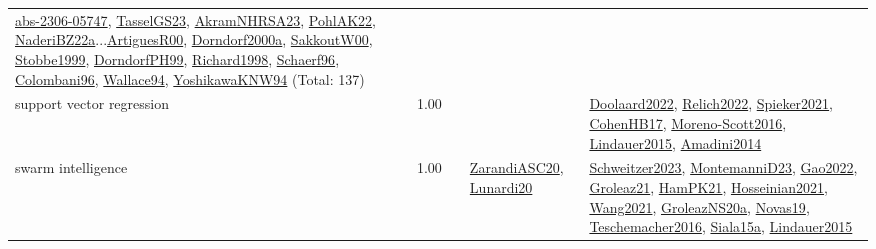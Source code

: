{\begin{longtable}{p{3cm}r>{\raggedright\arraybackslash}p{6cm}>{\raggedright\arraybackslash}p{6cm}>{\raggedright\arraybackslash}p{8cm}}
\hyperref[detail:abs-2306-05747]{abs-2306-05747}, \hyperref[detail:TasselGS23]{TasselGS23}, \hyperref[detail:AkramNHRSA23]{AkramNHRSA23}, \hyperref[detail:PohlAK22]{PohlAK22}, \hyperref[detail:NaderiBZ22a]{NaderiBZ22a}...\hyperref[detail:ArtiguesR00]{ArtiguesR00}, \hyperref[detail:Dorndorf2000a]{Dorndorf2000a}, \hyperref[detail:SakkoutW00]{SakkoutW00}, \hyperref[detail:Stobbe1999]{Stobbe1999}, \hyperref[detail:DorndorfPH99]{DorndorfPH99}, \hyperref[detail:Richard1998]{Richard1998}, \hyperref[detail:Schaerf96]{Schaerf96}, \hyperref[detail:Colombani96]{Colombani96}, \hyperref[detail:Wallace94]{Wallace94}, \hyperref[detail:YoshikawaKNW94]{YoshikawaKNW94} (Total: 137)\\
\index{support vector regression}\index{Algorithms!support vector regression}support vector regression &  1.00 &  &  & \hyperref[detail:Doolaard2022]{Doolaard2022}, \hyperref[detail:Relich2022]{Relich2022}, \hyperref[detail:Spieker2021]{Spieker2021}, \hyperref[detail:CohenHB17]{CohenHB17}, \hyperref[detail:Moreno-Scott2016]{Moreno-Scott2016}, \hyperref[detail:Lindauer2015]{Lindauer2015}, \hyperref[detail:Amadini2014]{Amadini2014}\\
\index{swarm intelligence}\index{Algorithms!swarm intelligence}swarm intelligence &  1.00 &  & \hyperref[detail:ZarandiASC20]{ZarandiASC20}, \hyperref[detail:Lunardi20]{Lunardi20} & \hyperref[detail:Schweitzer2023]{Schweitzer2023}, \hyperref[detail:MontemanniD23]{MontemanniD23}, \hyperref[detail:Gao2022]{Gao2022}, \hyperref[detail:Groleaz21]{Groleaz21}, \hyperref[detail:HamPK21]{HamPK21}, \hyperref[detail:Hosseinian2021]{Hosseinian2021}, \hyperref[detail:Wang2021]{Wang2021}, \hyperref[detail:GroleazNS20a]{GroleazNS20a}, \hyperref[detail:Novas19]{Novas19}, \hyperref[detail:Teschemacher2016]{Teschemacher2016}, \hyperref[detail:Siala15a]{Siala15a}, \hyperref[detail:Lindauer2015]{Lindauer2015}\\

\end{longtable}}

